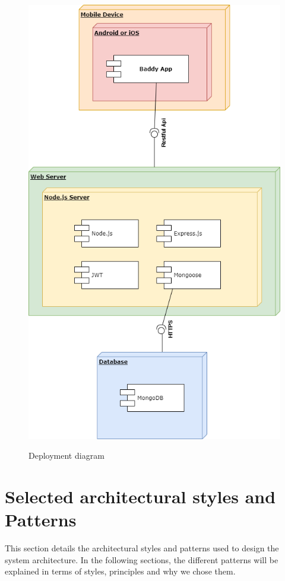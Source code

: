 \documentclass[../../dd.tex]{subfiles}
\begin{document}
    \begin{figure}[H]
        \centering
        \includegraphics[scale=0.5]{assets/deployment2.png}\\[1.6 cm]
        \caption[\textit{Deployment} Diagram]{ Deployment diagram}
    \end{figure}


    \section{Selected architectural styles and Patterns}
    This section details the architectural styles and patterns used to design the system architecture. In the following sections, the different patterns will be explained in terms of styles, principles and why we chose them.
\end{document}
